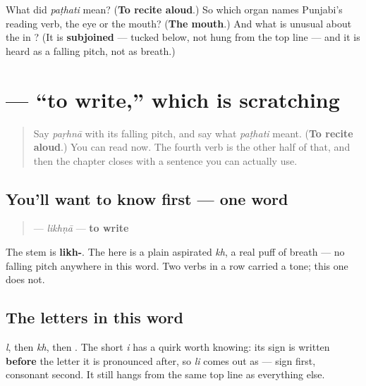 \begin{tcolorbox}[breakable,colback=teal!4,colframe=teal!35!black,title={Before you move on}]
What did \emph{paṭhati} mean? (\textbf{To recite aloud}.) So which organ names Punjabi's reading verb, the eye or the mouth? (\textbf{The mouth}.) And what is unusual about the \textbf{} in \textbf{}? (It is \textbf{subjoined} — tucked below, not hung from the top line — and it is heard as a falling pitch, not as breath.)
\end{tcolorbox}
\section[\texorpdfstring{\pa{ਲਿਖਣਾ} (likhṇā)}{ਲਿਖਣਾ (likhṇā)}]{ — “to write,” which is scratching}

\label{lesson:PA-C08-likhna}



\begin{quote}
Say \emph{paṛhnā} with its falling pitch, and say what \emph{paṭhati} meant. (\textbf{To recite aloud}.) You can read now. The fourth verb is the other half of that, and then the chapter closes with a sentence you can actually use.
\end{quote}

\subsection*{You'll want to know first — one word}
\begin{quote}
\textbf{} — \emph{likhṇā} — \textbf{to write}
\end{quote}

The stem is \textbf{likh-}. The \textbf{} here is a plain aspirated \emph{kh}, a real puff of breath — no falling pitch anywhere in this word. Two verbs in a row carried a tone; this one does not.

\subsection*{The letters in this word}
\textbf{} \emph{l}, then \textbf{} \emph{kh}, then \textbf{}. The short \emph{i} has a quirk worth knowing: its sign \textbf{} is written \textbf{before} the letter it is pronounced after, so \emph{li} comes out as \textbf{} — sign first, consonant second. It still hangs from the same top line as everything else.

